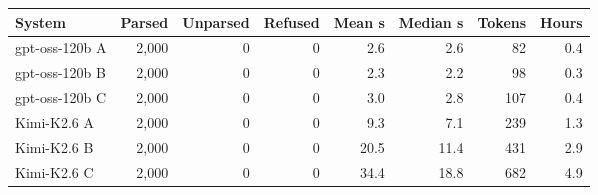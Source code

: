 \begin{tabular}{lrrrrrrr}
\toprule
System & Parsed & Unparsed & Refused & Mean s & Median s & Tokens & Hours \\
\midrule
gpt-oss-120b A & 2,000 & 0 & 0 & 2.6 & 2.6 & 82 & 0.4 \\
gpt-oss-120b B & 2,000 & 0 & 0 & 2.3 & 2.2 & 98 & 0.3 \\
gpt-oss-120b C & 2,000 & 0 & 0 & 3.0 & 2.8 & 107 & 0.4 \\
Kimi-K2.6 A & 2,000 & 0 & 0 & 9.3 & 7.1 & 239 & 1.3 \\
Kimi-K2.6 B & 2,000 & 0 & 0 & 20.5 & 11.4 & 431 & 2.9 \\
Kimi-K2.6 C & 2,000 & 0 & 0 & 34.4 & 18.8 & 682 & 4.9 \\
\bottomrule
\end{tabular}
